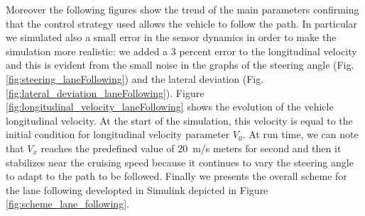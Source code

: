 Moreover the following figures show the trend of the main parameters confirming that the control strategy used allows the vehicle to follow the path. In particular we simulated also a small error in the sensor dynamics in order to make the simulation more realistic: we added a 3 percent error to the longitudinal velocity and this is evident from the small noise in the graphs of the steering angle (Fig.\ref{fig:steering_laneFollowing}) and the lateral deviation (Fig.\ref{fig:lateral_deviation_laneFollowing}).
Figure {\ref{fig:longitudinal_velocity_laneFollowing}} shows the evolution of the vehicle longitudinal velocity. At the start of the simulation, this velocity is equal to the initial condition for longitudinal velocity parameter $V_0$. At run time, we can note that $V_x$ reaches the predefined value of \SI{20}{m/s} meters for second and then it stabilizes near the cruising speed because it continues to vary the steering angle to adapt to the path to be followed. Finally we presents the overall scheme for the lane following developted in Simulink depicted in Figure \ref{fig:scheme_lane_following}.
